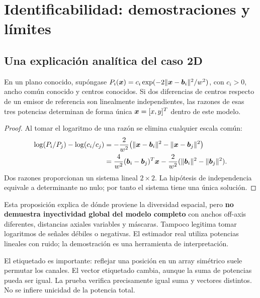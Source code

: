 \section{Identificabilidad: demostraciones y límites}
\subsection{Una explicación analítica del caso 2D}
\begin{proposicion}
En un plano conocido, supóngase $P_i(\bm{x})=c_i\exp(-2\|\bm{x}-\bm{b}_i\|^2/w^2)$, con $c_i>0$, ancho común conocido y centros conocidos. Si dos diferencias de centros respecto de un emisor de referencia son linealmente independientes, las razones de esas tres potencias determinan de forma única $\bm{x}=[x,y]^T$ dentro de este modelo.
\end{proposicion}
\begin{proof}
Al tomar el logaritmo de una razón se elimina cualquier escala común:
\begin{align}
\log(P_i/P_j)-\log(c_i/c_j)
&=-\frac2{w^2}\bigl(\|\bm{x}-\bm{b}_i\|^2-\|\bm{x}-\bm{b}_j\|^2\bigr)\\
&=\frac4{w^2}(\bm{b}_i-\bm{b}_j)^T\bm{x}
-\frac2{w^2}(\|\bm{b}_i\|^2-\|\bm{b}_j\|^2).
\end{align}
Dos razones proporcionan un sistema lineal $2\times2$. La hipótesis de independencia equivale a determinante no nulo; por tanto el sistema tiene una única solución.
\end{proof}

Esta proposición explica de dónde proviene la diversidad espacial, pero \textbf{no demuestra inyectividad global del modelo completo} con anchos off-axis diferentes, distancias axiales variables y máscaras. Tampoco legitima tomar logaritmos de señales débiles o negativas. El estimador real utiliza potencias lineales con ruido; la demostración es una herramienta de interpretación.

El etiquetado es importante: reflejar una posición en un array simétrico suele permutar los canales. El vector etiquetado cambia, aunque la suma de potencias pueda ser igual. La prueba  verifica precisamente igual suma y vectores distintos. No se infiere unicidad de la potencia total.

